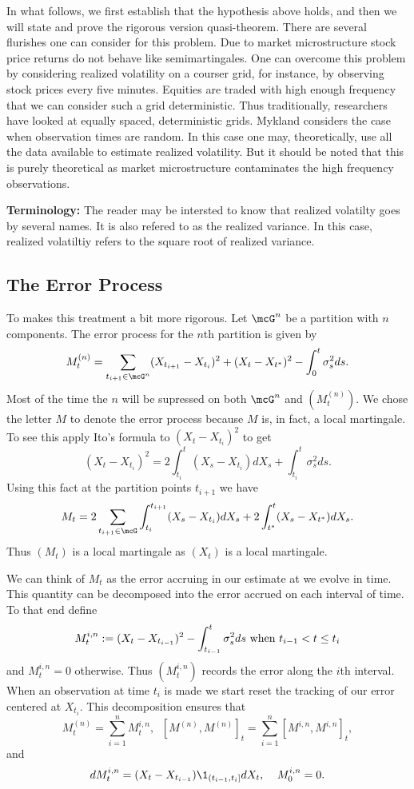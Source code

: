 \documentclass{report}
\begin{document}
\vspace{10pt} \noindent
In what follows, we first establish that the hypothesis above holds,
and then we will state and prove the rigorous version quasi-theorem. 
There are several flurishes one can consider for this problem.  Due to
market microstructure stock price returns do not behave like
semimartingales.  One can overcome this problem by considering
realized volatility on a courser grid, for instance, by observing
stock prices every five minutes.  Equities are traded with high enough
frequency that we can consider such a grid deterministic.  Thus
traditionally, researchers have looked at equally spaced,
deterministic grids.  Mykland considers the case when observation
times are random.  In this case one may, theoretically, use all the
data available to estimate realized volatility.  But it should be
noted that this is purely theoretical as market microstructure
contaminates the high frequency observations.

\vspace{10pt} \noindent \textbf{Terminology:}  The reader may be
intersted to know that realized volatilty goes by several names.  It
is also refered to as the realized variance.  In this case, realized
volatiltiy refers to the square root of realized variance.

\subsection{The Error Process}

To makes this treatment a bit more rigorous.  Let $\mcG^n$ be a
partition with $n$ components.  The error process for the $n$th
partition is given by
\[
M^{(n)}_t =  \sum_{t_{i+1} \in \mcG^n} (X_{t_{i+1}} - X_{t_i})^2 +
(X_{t} - X_{t^*})^2 - \int_0^t \sigma_s^2 ds.
\]
Most of the time the $n$ will be supressed on both $\mcG^n$ and
$(M_t^{(n)})$.  We chose the letter $M$ to denote the error process
because $M$ is, in fact, a local martingale.  To see this apply Ito's
formula to $(X_t - X_{t_i})^2$ to get
\[
(X_t - X_{t_i})^2 = 2 \int_{t_i}^t (X_s - X_{t_i}) dX_s + \int_{t_i}^t
\sigma_s^2 ds.
\]
Using this fact at the partition points $t_{i+1}$ we have
\[
M_t = 2  \sum_{t_{i+1} \in \mcG} \int_{t_i}^{t_{i+1}} (X_s - X_{t_i})
dX_s + 2 \int_{t^*}^t (X_s - X_{t^*}) dX_s.
\]
Thus $(M_t)$ is a local martingale as $(X_t)$ is a local martingale. 

We can think of $M_t$ as the error accruing in our estimate at we
evolve in time.  This quantity can be decomposed into the error
accrued on each interval of time.  To that end define
\[
M^{i,n}_t : = (X_{t} - X_{t_{i-1}})^2 - \int_{t_{i-1}}^t \sigma_s^2 ds
\textmd{ when } t_{i-1} < t \leq t_{i}
\]
and $M^{i,n}_t = 0$ otherwise.  Thus $(M^{i,n}_t)$ records the error
along the $i$th interval.  When an observation at time $t_i$ is made
we start reset the tracking of our error centered at $X_{t_i}$.  This
decomposition ensures that
\[
M^{(n)}_t = \sum_{i=1}^n M^{i,n}_t,  \;\; [M^{(n)},M^{(n)}]_t =
\sum_{i=1}^n [M^{i,n} ,M^{i,n}]_t, 
\]
and
\[
d M^{i,n}_t = (X_t - X_{t_{i-1}}) \1_{(t_{i-1},t_i]} d X_t, \;\;\;\;
M^{i,n}_0 = 0.
\]
\end{document}
